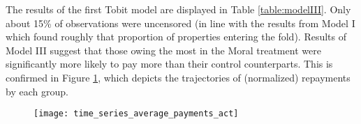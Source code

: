 \documentclass[12pt,titlepage]{article}
\begin{document}
The results of the first Tobit model are displayed in Table
\ref{table:modelIII}.  Only about 15\% of observations were
uncensored (in line with the results from Model I which found 
roughly that proportion of properties entering the fold).
Results of Model III suggest that those owing the most in
the Moral treatment were significantly more likely to pay more than
their control counterparts. This is confirmed in Figure
\ref{fig:repay}, which depicts the trajectories of (normalized)
repayments by each group.

\begin{figure}[htbp]
\begin{center}
\caption{}\label{fig:repay}
\texttt{[image: time\_series\_average\_payments\_act]}
\par\end{center}
\end{figure}
\end{document}
